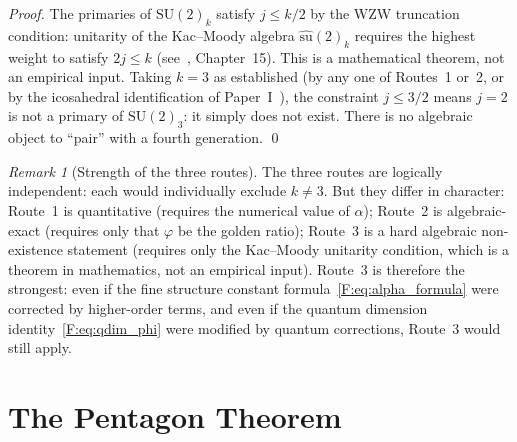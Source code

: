 \documentclass[11pt,a4paper]{article}
\theoremstyle{definition}
\theoremstyle{remark}
\newtheorem{remark}[theorem]{Remark}
\newcommand{\vp}{\varphi}
\begin{document}
\begin{proof}
The primaries of $\mathrm{SU}(2)_k$ satisfy $j \leq k/2$ by the
WZW truncation condition: unitarity of the Kac--Moody algebra
$\widehat{\mathrm{su}}(2)_k$ requires the highest weight to satisfy
$2j \leq k$ (see~\cite{DiFrancesco1997}, Chapter~15).
This is a mathematical theorem, not an empirical input.
Taking $k=3$ as established (by any one of Routes~1 or~2,
or by the icosahedral identification of Paper~I~\cite{Paper1}),
the constraint $j \leq 3/2$ means $j=2$ is not a primary
of $\mathrm{SU}(2)_3$: it simply does not exist.
There is no algebraic object to ``pair'' with a fourth generation.
\qed
\end{proof}

\begin{remark}[Strength of the three routes]
\label{F:rem:route_strength}
The three routes are logically independent: each would individually
exclude $k\neq3$. But they differ in character:
Route~1 is quantitative (requires the numerical value of $\alpha$);
Route~2 is algebraic-exact (requires only that $\vp$ be the golden ratio);
Route~3 is a hard algebraic non-existence statement (requires only the
Kac--Moody unitarity condition, which is a theorem in mathematics,
not an empirical input).
Route~3 is therefore the strongest: even if the fine structure constant
formula~\eqref{F:eq:alpha_formula} were corrected by higher-order terms,
and even if the quantum dimension identity~\eqref{F:eq:qdim_phi} were
modified by quantum corrections, Route~3 would still apply.
\end{remark}

\section{The Pentagon Theorem}
\label{F:sec:theorem}
\end{document}
